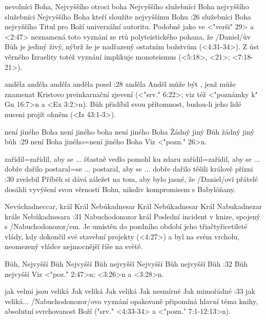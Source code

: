     {nevolníci Boha, Nejvyššího} %
    {otroci boha Nejvyššího}  %
    {služebníci Boha nejvyššího} %
    {služebníci Nejvyššího Boha}  %
    {kteří sloužíte nejvyššímu Bohu}  %
:26 {služebníci Boha nejvyššího} Titul pro Boží univerzální autoritu. Podobně jako ve
        <"verši" 29> a <2:47> neznamená toto vyznání ze rtů polyteistického pohana, 
        že \x/Daniel/ův Bůh je jediný živý, nýbrž že je nadřazený ostatním božstvům (<4:31-34>).
        Z úst věrného Izraelity totéž vyznání implikuje monoteismus (<5:18>, <21>; <7:18-21>).

    {anděla} %
    {anděla}  %
    {anděla} %
    {anděla}  %
    {posel}  %
:28 {anděla} Anděl může být , jenž může znamenat Kristovo preinkarnační zjevení (<"srv." 6:22>; viz též <"poznámky k" Gn 16:7>n a <Ex 3:2>n). Bůh přislíbil svou přítomnost, budou-li jeho lidé nuceni projít ohněm (<Iz 43:1-3>). 

    {není jiného Boha} %
    {není jiného boha}  %
    {není jiného Boha} %
    {Žádný jiný Bůh}  %
    {žádný jiný bůh}  %
:29 {není Boha jiného}={není jiného Boha} Viz <"pozn." 26>n.

    {zařídil}={zařídil, aby se ... šťastně vedlo} %
    {pomohl ku zdaru}  %
    {zařídil}={zařídil, aby se ... dobře dařilo} %
    {postaral}={se ... postaral, aby se ... dobře dařilo}  %
    {těšili králově přízni}  %
:30 {zvelebil} Příběh si dává záležet na tom, aby bylo jasné, že \x/Daniel/ovi přátelé dosáhli vyvýšení svou věrností  Bohu, nikoliv kompromisem s Babylóňany. 

    {Nevúchadneccar, král}   %
    {Král Nebúkadnesar}   %
    {Král Nebúkadnesar}   %
    {Král Nabukadnezar}   %
    {krále Nebúkadnesara}   %
:31 {Nabuchodonozor král} Poslední incident v knize, spojený s \x/Nabuchodonozor/em. Je umístěn do pozdního období jeho třiačtyřicetileté vlády, kdy dokončil své stavební projekty (<4:27>) a byl na svém vrcholu, neomezený vládce nejmocnější říše na světě. 

    {Bůh, Nejvyšší}   %
    {Bůh Nejvyšší}   %
    {Bůh nejvyšší}   %
    {Nejvyšší Bůh}   %
    {nejvyšší Bůh}   %
:32 {Bůh nejvyšší} Viz <"poz." 2:47>n;  <3:26>n a <3:28>n.

    {jak velmi jsou veliká}   %
    {Jak veliká}   %
    {Jak veliká}   %
    {Jak nesmírné}   %
    {Jak mimořádné}   %
:33 {jak veliká}...  \x/Nabuchodonozor/ovo vyznání opakovaně připomíná hlavní téma knihy, absolutní svrchovanost Boží ("srv." <4:33-34> a <"pozn." 7:1-12:13>n).

